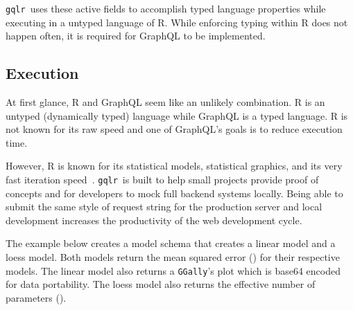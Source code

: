 \documentclass[stat,dissertation]{puthesis}\usepackage[]{graphicx}\usepackage{xcolor}
\newcommand{\pkg}[1]{\texttt{#1}}
\newcommand{\gqlr}{\pkg{gqlr}}
\newcommand{\GGally}{\pkg{GGally}}
\begin{document}
\gqlr~uses these active fields to accomplish typed language properties while executing in a untyped language of R.  While enforcing typing within R does not happen often, it is required for GraphQL to be implemented.

\subsection{Execution}

At first glance, R and GraphQL seem like an unlikely combination.  R is an untyped (dynamically typed) language while GraphQL is a typed language.  R is not known for its raw speed and one of GraphQL's goals is to reduce execution time.

However, R is known for its statistical models, statistical graphics, and its very fast iteration speed~\cite{r_about}.  \gqlr~is built to help small projects provide proof of concepts and for developers to mock full backend systems locally.  Being able to submit the same style of request string for the production server and local development increases the productivity of the web development cycle.

The example below creates a model schema that creates a linear model and a loess model.  Both models return the mean squared error () for their respective models.  The linear model also returns a \GGally's  plot which is base64 encoded~\cite{josefsson2006base16} for data portability.  The loess model also returns the effective number of parameters ().
\end{document}
